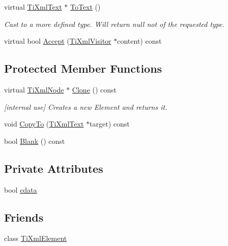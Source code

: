 \begin{DoxyCompactItemize}
virtual \hyperlink{class_ti_xml_text}{TiXmlText} $\ast$ \hyperlink{class_ti_xml_text_ae7c3a8fd3e4dbf6c0c4363a943d72f5b}{ToText} ()
\begin{DoxyCompactList}\small\item\em Cast to a more defined type. Will return null not of the requested type. \item\end{DoxyCompactList}\item 
virtual bool \hyperlink{class_ti_xml_text_a43b9954ebf679557fac1a4453f337b7c}{Accept} (\hyperlink{class_ti_xml_visitor}{TiXmlVisitor} $\ast$content) const 
\end{DoxyCompactItemize}
\subsection*{Protected Member Functions}
\begin{DoxyCompactItemize}
\item 
virtual \hyperlink{class_ti_xml_node}{TiXmlNode} $\ast$ \hyperlink{class_ti_xml_text_adde1869dfb029be50713fbfd8ce4d21f}{Clone} () const 
\begin{DoxyCompactList}\small\item\em \mbox{[}internal use\mbox{]} Creates a new Element and returns it. \item\end{DoxyCompactList}\item 
void \hyperlink{class_ti_xml_text_adcec7d9b6fccfc5777452bb97e6031c1}{CopyTo} (\hyperlink{class_ti_xml_text}{TiXmlText} $\ast$target) const 
\item 
bool \hyperlink{class_ti_xml_text_a1c120428e3b3cf24d79706e6d2b65aa6}{Blank} () const 
\end{DoxyCompactItemize}
\subsection*{Private Attributes}
\begin{DoxyCompactItemize}
\item 
bool \hyperlink{class_ti_xml_text_a1919a0467daf2cf5d099b225add5b9f1}{cdata}
\end{DoxyCompactItemize}
\subsection*{Friends}
\begin{DoxyCompactItemize}
\item 
class \hyperlink{class_ti_xml_text_ab6592e32cb9132be517cc12a70564c4b}{TiXmlElement}
\end{DoxyCompactItemize}


